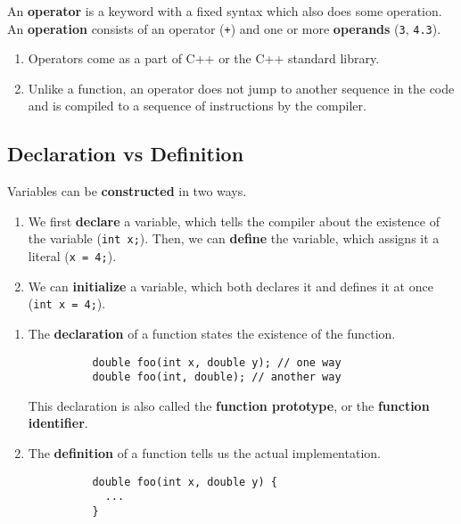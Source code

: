 \documentclass{article}
\begin{document}
    \begin{definition}[Operations]
      An \textbf{operator} is a keyword with a fixed syntax which also does some operation.  An \textbf{operation} consists of an operator (\texttt{+}) and one or more \textbf{operands} (\texttt{3}, \texttt{4.3}).  
      \begin{enumerate}
        \item Operators come as a part of C++ or the C++ standard library. 
        \item Unlike a function, an operator does not jump to another sequence in the code and is compiled to a sequence of instructions by the compiler.
      \end{enumerate}
    \end{definition}

  \subsection{Declaration vs Definition} 

    Variables can be \textbf{constructed} in two ways. 
    \begin{enumerate}
      \item We first \textbf{declare} a variable, which tells the compiler about the existence of the variable (\texttt{int x;}). Then, we can \textbf{define} the variable, which assigns it a literal (\texttt{x = 4;}). 
      \item We can \textbf{initialize} a variable, which both declares it and defines it at once (\texttt{int x = 4;}).
    \end{enumerate}

    \begin{enumerate}
      \item The \textbf{declaration} of a function states the existence of the function. 
        \begin{lstlisting}
          double foo(int x, double y); // one way 
          double foo(int, double); // another way 
        \end{lstlisting}
        This declaration is also called the \textbf{function prototype}, or the \textbf{function identifier}. 

      \item The \textbf{definition} of a function tells us the actual implementation. 
        \begin{lstlisting}
          double foo(int x, double y) {
            ...
          }
        \end{lstlisting}
    \end{enumerate}
\end{document}
